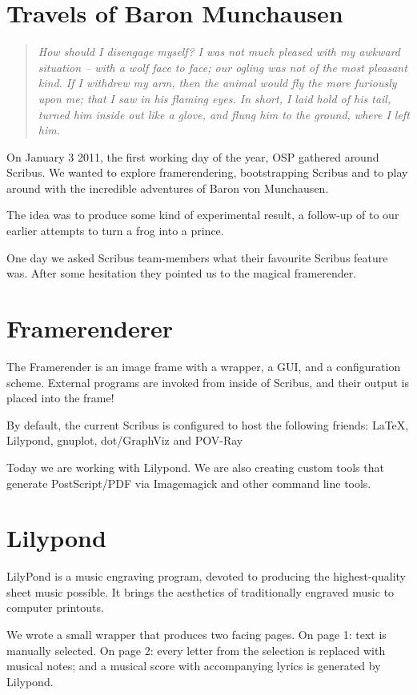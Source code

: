 \section*{Travels of Baron Munchausen}
\begin{quote}
\textit{How should I disengage myself? I was not much pleased with my awkward
situation -- with a wolf face to face; our ogling was not of the most pleasant
kind. If I withdrew my arm, then the animal would fly the more furiously upon
me; that I saw in his flaming eyes. In short, I laid hold of his tail, turned
him inside out like a glove, and flung him to the ground, where I left him.}
\end{quote}

On January 3 2011, the first working day of the year, OSP gathered around
Scribus. We wanted to explore framerendering, bootstrapping Scribus and to
play around with the incredible adventures of Baron von Munchausen.

The idea was to produce some kind of experimental result, a follow-up of to
our earlier attempts to turn a frog into a prince.

One day we asked Scribus team-members what their favourite Scribus feature
was. After some hesitation they pointed us to the magical framerender.

\section*{Framerenderer}
The Framerender is an image frame with a wrapper, a GUI, and a configuration
scheme. External programs are invoked from inside of Scribus, and their output
is placed into the frame!

By default, the current Scribus is configured to host the following friends:
LaTeX, Lilypond, gnuplot, dot/GraphViz and POV-Ray

Today we are working with Lilypond. We are also creating custom tools that
generate PostScript/PDF via Imagemagick and other command line tools.

\section*{Lilypond}
LilyPond is a music engraving program, devoted to producing the
highest-quality sheet music possible.  It brings the aesthetics of
traditionally engraved music to computer printouts.

We wrote a small wrapper that produces two facing pages. On page 1: text is
manually selected. On page 2: every letter from the selection is replaced with
musical notes; and a musical score with accompanying lyrics is generated by
Lilypond. 
